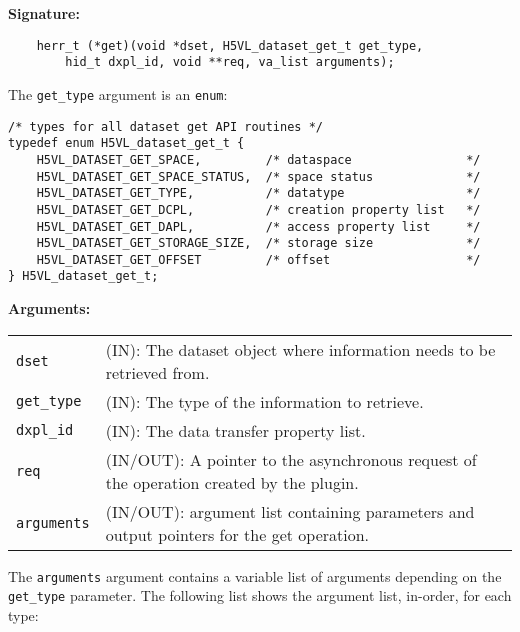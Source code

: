 \textbf{Signature:}
\begin{lstlisting}
    herr_t (*get)(void *dset, H5VL_dataset_get_t get_type, 
        hid_t dxpl_id, void **req, va_list arguments);
\end{lstlisting}

The {\tt get\_type} argument is an {\tt enum}:
\begin{lstlisting}
/* types for all dataset get API routines */
typedef enum H5VL_dataset_get_t {
    H5VL_DATASET_GET_SPACE,         /* dataspace                */
    H5VL_DATASET_GET_SPACE_STATUS,  /* space status             */
    H5VL_DATASET_GET_TYPE,          /* datatype                 */
    H5VL_DATASET_GET_DCPL,          /* creation property list   */
    H5VL_DATASET_GET_DAPL,          /* access property list     */
    H5VL_DATASET_GET_STORAGE_SIZE,  /* storage size             */
    H5VL_DATASET_GET_OFFSET         /* offset                   */
} H5VL_dataset_get_t;
\end{lstlisting}

\textbf{Arguments:}\\
\begin{tabular}{l p{10cm}}
  {\tt dset} & (IN): The dataset object where information needs to be
  retrieved from.\\
  {\tt get\_type} & (IN): The type of the information to retrieve.\\
  {\tt dxpl\_id} & (IN): The data transfer property list.\\
  {\tt req} & (IN/OUT): A pointer to the asynchronous request of the
  operation created by the plugin.\\
  {\tt arguments} & (IN/OUT): argument list containing parameters and
  output pointers for the get operation. \\
\end{tabular}

The {\tt arguments} argument contains a variable list of arguments
depending on the {\tt get\_type} parameter. The following list shows
the argument list, in-order, for each type:


